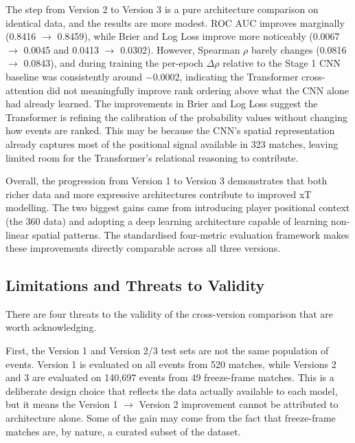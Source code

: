 \documentclass{article}
\begin{document}
The step from Version 2 to Version 3 is a pure architecture comparison on identical data, and the results are more modest. ROC AUC improves marginally (0.8416 $\to$ 0.8459), while Brier and Log Loss improve more noticeably (0.0067 $\to$ 0.0045 and 0.0413 $\to$ 0.0302). However, Spearman $\rho$ barely changes (0.0816 $\to$ 0.0843), and during training the per-epoch $\Delta\rho$ relative to the Stage 1 CNN baseline was consistently around $-0.0002$, indicating the Transformer cross-attention did not meaningfully improve rank ordering above what the CNN alone had already learned. The improvements in Brier and Log Loss suggest the Transformer is refining the calibration of the probability values without changing how events are ranked. This may be because the CNN's spatial representation already captures most of the positional signal available in 323 matches, leaving limited room for the Transformer's relational reasoning to contribute.

Overall, the progression from Version 1 to Version 3 demonstrates that both richer data and more expressive architectures contribute to improved xT modelling. The two biggest gains came from introducing player positional context (the 360 data) and adopting a deep learning architecture capable of learning non-linear spatial patterns. The standardised four-metric evaluation framework makes these improvements directly comparable across all three versions.

\subsection{Limitations and Threats to Validity}

There are four threats to the validity of the cross-version comparison that are worth acknowledging.

First, the Version 1 and Version 2/3 test sets are not the same population of events. Version 1 is evaluated on all events from 520 matches, while Versions 2 and 3 are evaluated on 140,697 events from 49 freeze-frame matches. This is a deliberate design choice that reflects the data actually available to each model, but it means the Version 1 $\to$ Version 2 improvement cannot be attributed to architecture alone. Some of the gain may come from the fact that freeze-frame matches are, by nature, a curated subset of the dataset.
\end{document}
